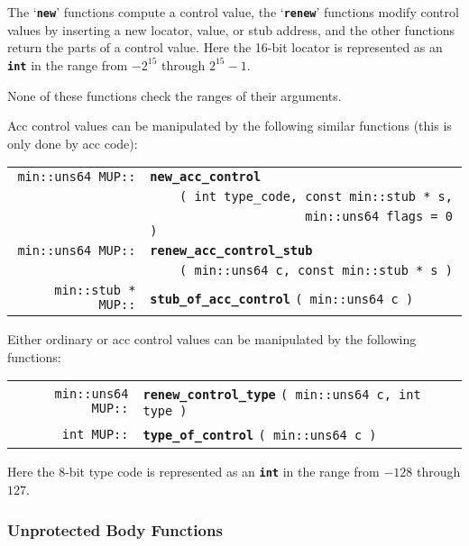 \documentclass[12pt]{article}
\makeatletter
\newcommand{\TT}[1]{{\tt \bfseries #1}}
\newcommand{\ttindex}[1]{\index{#1@{\tt #1}}}
\newcommand{\MUPindex}[1]{\ttindex{MUP::#1}\ttindex{#1}}
\newenvironment{indpar}[1][0.3in]%
	{\begin{list}{}%
		     {\setlength{\itemsep}{0in}%
		      \setlength{\topsep}{0in}%
		      \setlength{\parsep}{1ex}%
		      \setlength{\labelwidth}{#1}%
		      \setlength{\leftmargin}{#1}%
		      \addtolength{\leftmargin}{\labelsep}}%
	 \item}%
	{\end{list}}
\newcommand{\LABEL}[1]{\label{#1}}
\newcommand{\MUPKEY}[1]{{\tt \bf #1}\MUPindex{#1}}
\makeatother
\begin{document}
The `\TT{new}' functions compute a control value,
the `\TT{renew}' functions modify control values
by inserting a new locator, value, or stub address, and
the other functions return the parts of a control value.
Here the 16-bit locator is represented as an \TT{int}
in the range from $-2^{15}$ through $2^{15}-1$.

None of these functions check the ranges of their arguments.

Acc control values can be manipulated by the following similar functions
(this is only done by acc code):

\begin{indpar}\begin{tabular}{@{}r@{}l@{}}
\verb|min::uns64 MUP::|
    & \MUPKEY{new\_acc\_control} \\
    & \verb|    ( int type_code, const min::stub * s,| \\
    & \verb|                     min::uns64 flags = 0 )|
\LABEL{MUP::NEW_ACC_CONTROL_OF_STUB} \\
\verb|min::uns64 MUP::|
    & \MUPKEY{renew\_acc\_control\_stub} \\
    & \verb|    ( min::uns64 c, const min::stub * s )|
\LABEL{MUP::RENEW_ACC_CONTROL_STUB} \\
\verb|min::stub * MUP::|
    & \MUPKEY{stub\_of\_acc\_control} \verb|( min::uns64 c )|
\LABEL{MUP::STUB_OF_ACC_CONTROL} \\
\end{tabular}\end{indpar}

Either ordinary or acc control values can be
manipulated by the following functions:

\begin{indpar}\begin{tabular}{@{}r@{}l@{}}
\verb|min::uns64 MUP::|
    & \MUPKEY{renew\_control\_type} \verb|( min::uns64 c, int type )|
\LABEL{MUP::RENEW_CONTROL_TYPE} \\
\verb|int MUP::| & \MUPKEY{type\_of\_control} \verb|( min::uns64 c )|
\LABEL{MUP::TYPE_OF_CONTROL} \\
\end{tabular}\end{indpar}

Here the 8-bit type code is represented as an \TT{int} in
the range from $-128$ through $127$.

\subsubsection{Unprotected Body Functions}
\label{UNPROTECTED-BODY-FUNCTIONS}
\end{document}
